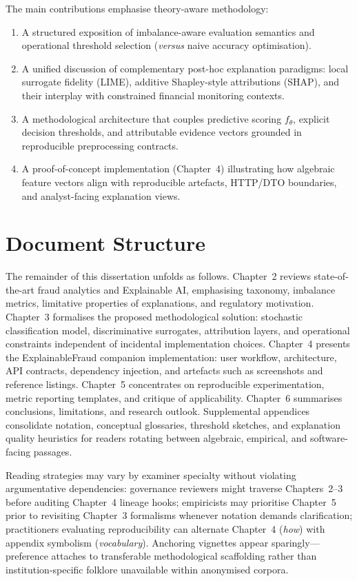 The main contributions emphasise theory-aware methodology:
\begin{enumerate}
    \item A structured exposition of imbalance-aware evaluation semantics and operational threshold selection (\emph{versus} naive accuracy optimisation).
    \item A unified discussion of complementary post-hoc explanation paradigms: local surrogate fidelity (LIME), additive Shapley-style attributions (SHAP), and their interplay with constrained financial monitoring contexts.
    \item A methodological architecture that couples predictive scoring $f_\theta$, explicit decision thresholds, and attributable evidence vectors grounded in reproducible preprocessing contracts.
    \item A proof-of-concept implementation (Chapter~4) illustrating how algebraic feature vectors align with reproducible artefacts, HTTP/DTO boundaries, and analyst-facing explanation views.
\end{enumerate}

\section{Document Structure}
The remainder of this dissertation unfolds as follows. Chapter~2 reviews state-of-the-art fraud analytics and Explainable AI, emphasising taxonomy, imbalance metrics, limitative properties of explanations, and regulatory motivation. Chapter~3 formalises the proposed methodological solution: stochastic classification model, discriminative surrogates, attribution layers, and operational constraints independent of incidental implementation choices. Chapter~4 presents the ExplainableFraud companion implementation: user workflow, architecture, API contracts, dependency injection, and artefacts such as screenshots and reference listings. Chapter~5 concentrates on reproducible experimentation, metric reporting templates, and critique of applicability. Chapter~6 summarises conclusions, limitations, and research outlook. Supplemental appendices consolidate notation, conceptual glossaries, threshold sketches, and explanation quality heuristics for readers rotating between algebraic, empirical, and software-facing passages.

Reading strategies may vary by examiner specialty without violating argumentative dependencies: governance reviewers might traverse Chapters~2--3 before auditing Chapter~4 lineage hooks; empiricists may prioritise Chapter~5 prior to revisiting Chapter~3 formalisms whenever notation demands clarification; practitioners evaluating reproducibility can alternate Chapter~4 (\emph{how}) with appendix symbolism (\emph{vocabulary}). Anchoring vignettes appear sparingly—preference attaches to transferable methodological scaffolding rather than institution-specific folklore unavailable within anonymised corpora.